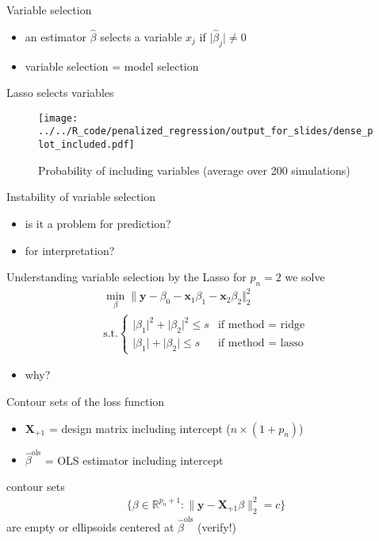 \documentclass[xcolor=dvipsnames]{beamer}
\begin{document}
\begin{frame}{Variable selection}
\begin{itemize}
  \item an estimator $\hat{\beta}$ selects a variable $x_j$ if $\lvert \hat{\beta}_j \rvert \neq 0$
  \item variable selection = model selection
\end{itemize}
\end{frame}


\begin{frame}{Lasso selects variables}
\begin{figure}
  \texttt{[image: ../../R\_code/penalized\_regression/output\_for\_slides/dense\_plot\_included.pdf]}
   \caption{Probability of including variables (average over 200 simulations)}
\end{figure}
\end{frame}


\begin{frame}{Instability of variable selection}
\begin{itemize}
  \item is it a problem for prediction?
  \item for interpretation?
\end{itemize}
\end{frame}


\begin{frame}{Understanding variable selection by the Lasso}
for $p_n = 2$ we solve 
\begin{align*}
  \min_{\beta} \lVert \mathbf{y} - \beta_0 - \mathbf{x}_1\beta_1 - \mathbf{x}_2\beta_2 \Vert_2^2
  \\
  \text{s.t.} \begin{cases}
    \lvert\beta_1\rvert^2 + \lvert \beta_2\rvert^2 \leq s & \text{if method = ridge}
  \\
    \lvert \beta_1\vert + \lvert \beta_2 \rvert \leq s & \text{if method = lasso}
  \end{cases}
\end{align*}
\begin{itemize}
  \item why?
\end{itemize}
\end{frame}


\begin{frame}{Contour sets of the loss function}    
\begin{itemize}
  \item 
  $\mathbf{X}_{+1}$ = design matrix including intercept ($n \times (1 + p_n)$)
  \item 
  $\hat{\beta}^{\text{ols}}$ = OLS estimator including intercept
\end{itemize}
contour sets 
\begin{align*}
\big\{
  \beta \in \mathbb{R}^{p_n + 1} : \lVert \mathbf{y} - \mathbf{X}_{+1} \beta \rVert_2^2 = c 
\big\}
\end{align*}
are empty or ellipsoids centered at $\hat{\beta}^{\text{ols}}$ (verify!)
\end{frame}
\end{document}
